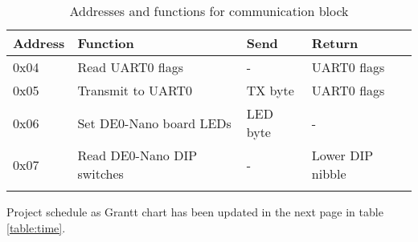 \documentclass[a4paper,11pt]{article}
\begin{document}
\begin{table}[h!]
	\centering
	\begin{tabular}{| l | p{8cm} | l | l | } \hline 
		\rowcolor[rgb]{0.82,0.82,0.82}
		Address & Function & Send & Return \\\hline
		\arrayrulecolor[rgb]{0.82,0.82,0.82}
		0x04 & Read UART0 flags 		& - 	& UART0 flags 	\\\hline
		0x05 & Transmit to UART0 		& TX byte 	& UART0 flags 	\\\hline
		0x06 & Set DE0-Nano board LEDs	& LED byte 	& - 		\\\hline
		0x07 & Read DE0-Nano DIP switches & - & Lower DIP nibble	\\\hline
		\arrayrulecolor{black}\hline
		
	\end{tabular}
	\caption{Addresses and functions for communication block}
	\label{table:com_instr}
\end{table}

Project schedule as Grantt chart has been updated in the next page in table \ref{table:time}. 
\end{document}
